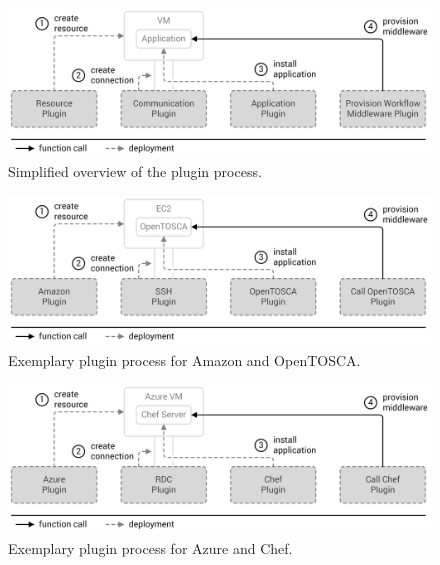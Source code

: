 \begin{figure}[!htbp]
	\centering
	\includegraphics[resolution=600]{design/assets/plugin_process}
	\caption{Simplified overview of the plugin process.}
	\label{image:plugin_process}
\end{figure}

\vspace{1.0cm}

\begin{figure}[!htbp]
	\centering
	\includegraphics[resolution=600]{design/assets/plugin_process_2}
	\caption{Exemplary plugin process for Amazon and OpenTOSCA.}
	\label{image:plugin_process_2}
\end{figure}

\vspace{1.0cm}

\begin{figure}[!htbp]
	\centering
	\includegraphics[resolution=600]{design/assets/plugin_process_3}
	\caption{Exemplary plugin process for Azure and Chef.}
	\label{image:plugin_process_3}
\end{figure}


